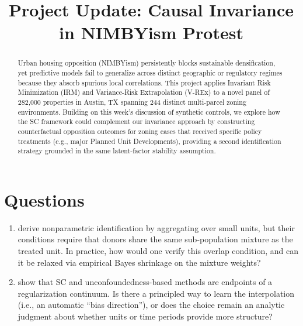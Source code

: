 \documentclass[11pt,twoside]{article}
\begin{document}
\section*{Questions}
\begin{enumerate}
    \item \citet{shi2022sc} derive nonparametric identification by aggregating over small units, but their conditions require that donors share the same sub-population mixture as the treated unit. In practice, how would one verify this overlap condition, and can it be relaxed via empirical Bayes shrinkage on the mixture weights?
    \item \citet{athey2021mc} show that SC and unconfoundedness-based methods are endpoints of a regularization continuum. Is there a principled way to learn the interpolation (i.e., an automatic ``bias direction''), or does the choice remain an analytic judgment about whether units or time periods provide more structure?
\end{enumerate}

\newpage
\title{\textbf{Project Update: Causal Invariance in NIMBYism Protest}}
\maketitle
\thispagestyle{empty}

\begin{abstract}
Urban housing opposition (NIMBYism) persistently blocks sustainable densification, yet predictive models fail to generalize across distinct geographic or regulatory regimes because they absorb spurious local correlations. This project applies Invariant Risk Minimization (IRM) and Variance-Risk Extrapolation (V-REx) to a novel panel of 282,000 properties in Austin, TX spanning 244 distinct multi-parcel zoning environments. Building on this week's discussion of synthetic controls, we explore how the SC framework could complement our invariance approach by constructing counterfactual opposition outcomes for zoning cases that received specific policy treatments (e.g., major Planned Unit Developments), providing a second identification strategy grounded in the same latent-factor stability assumption.
\end{abstract}
\end{document}
